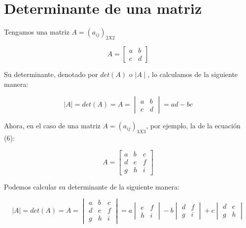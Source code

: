 \documentclass{article}
\begin{document}
\section{Determinante de una matriz}

  Tengamos una matriz $A = (a_{ij})_{2X2}$

  \begin{equation}
    A = \begin{bmatrix}
          a & b \\
          c & d
        \end{bmatrix}
  \end{equation}

  Su determinante, denotado por $det(A)$ o $ \mid A \mid $, lo calculamos de la siguiente manera:

  \begin{equation}
    \mid A \mid = det(A) = A = \begin{vmatrix}
                                  a & b \\
                                  c & d
                                \end{vmatrix} = ad-bc
  \end{equation}

  Ahora, en el caso de una matriz $A = (a_{ij})_{3X3}$, por ejemplo, la de la ecuación (6):

  \begin{equation*}
    A= \begin{bmatrix}
            a & b & c \\
            d & e & f \\
            g & h & i 
      \end{bmatrix}
  \end{equation*}

Podemos calcular su determinante de la siguiente manera:

\begin{equation}
  \mid A \mid = det(A) = A= \begin{vmatrix}
                                a & b & c \\
                                d & e & f \\
                                g & h & i 
                            \end{vmatrix} 
                            =a\begin{vmatrix}
                              e & f \\
                              h & i
                            \end{vmatrix} -
                            b\begin{vmatrix}
                              d & f \\
                              g & i
                            \end{vmatrix} +
                            c\begin{vmatrix}
                              d & e \\
                              g & h
                            \end{vmatrix} 
\end{equation}
\end{document}
